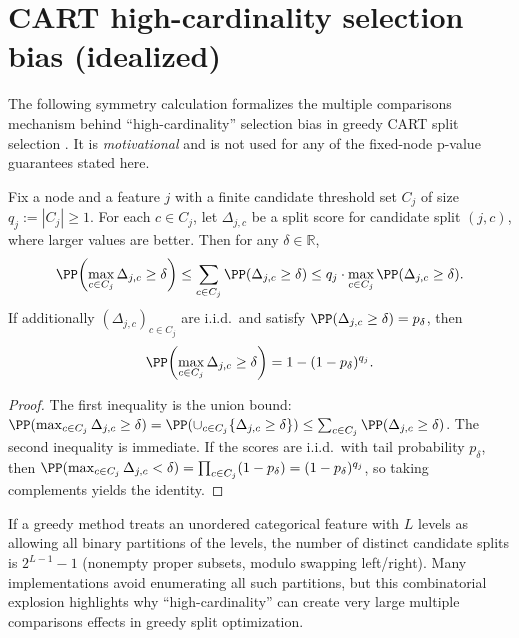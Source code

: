 \section{CART high-cardinality selection bias (idealized)}
\label{app:cart-bias}

The following symmetry calculation formalizes the multiple comparisons
mechanism behind ``high-cardinality'' selection bias in greedy CART
split selection \citep{Breiman1984ClassificationAndRegressionTrees}. It is
\emph{motivational} and is not used for any of the fixed-node p-value
guarantees stated here.

\begin{lemma}
\label{lem:cart-union-bound}
Fix a node and a feature $j$ with a finite candidate threshold set $C_j$ of size
$q_j := |C_j| \ge 1$. For each $c \in C_j$, let $\Delta_{j,c}$ be a split score
for candidate split $(j,c)$, where larger values are better. Then for any
$\delta \in \mathbb{R}$,
%
\begin{equation}
  \PP\!\left(\max_{c \in C_j} \Delta_{j,c} \ge \delta\right)
  \le \sum_{c \in C_j} \PP(\Delta_{j,c} \ge \delta)
  \le q_j \cdot \max_{c \in C_j} \PP(\Delta_{j,c} \ge \delta).
\end{equation}
%
If additionally $(\Delta_{j,c})_{c \in C_j}$ are i.i.d.\ and satisfy
$\PP(\Delta_{j,c} \ge \delta) = p_\delta$, then
%
\begin{equation}
  \PP\!\left(\max_{c \in C_j} \Delta_{j,c} \ge \delta\right) = 1-(1-p_\delta)^{q_j}.
\end{equation}
\end{lemma}

\begin{proof}
The first inequality is the union bound:
$\PP(\max_{c \in C_j}\Delta_{j,c} \ge \delta)
= \PP(\cup_{c \in C_j}\{\Delta_{j,c} \ge \delta\})
\le \sum_{c \in C_j}\PP(\Delta_{j,c} \ge \delta)$.
The second inequality is immediate.
If the scores are i.i.d.\ with tail probability $p_\delta$, then
$\PP(\max_{c \in C_j}\Delta_{j,c} < \delta) = \prod_{c \in C_j} (1-p_\delta)
  = (1-p_\delta)^{q_j}$, so taking complements yields the identity.
\end{proof}

\begin{remark}
If a greedy method treats an unordered categorical feature with $L$ levels as
allowing all binary partitions of the levels, the number of distinct candidate
splits is $2^{L-1}-1$ (nonempty proper subsets, modulo swapping left/right).
Many implementations avoid enumerating all such partitions, but this
combinatorial explosion highlights why ``high-cardinality'' can create very
large multiple comparisons effects in greedy split optimization.
\end{remark}

